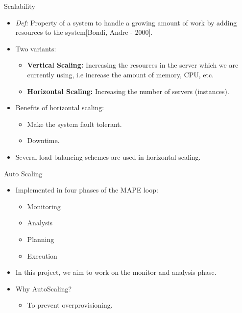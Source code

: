 \documentclass{beamer}
\begin{document}
\begin{frame}{Scalability}
    \begin{itemize}
        
        \pause\item \textit{Def:} Property of a system to handle a growing amount of work by adding resources
            to the system[Bondi, Andre - 2000].
        
        \pause\item Two variants:
            \begin{itemize}
                
                \pause\item \textbf{Vertical Scaling:} Increasing the resources in the
                        server which we are currently using, i.e increase the amount of memory, CPU, etc.
                
                \pause\item \textbf{Horizontal Scaling:} Increasing the number of servers (instances).
            \end{itemize}
        
        \pause\item Benefits of horizontal scaling:
            \begin{itemize}
                
                \pause\item Make the system fault tolerant.
                
                \pause\item Downtime.
            \end{itemize}
        
        \pause\item Several load balancing schemes are used in horizontal scaling.
    \end{itemize}
\end{frame}


\begin{frame}{Auto Scaling}
\begin{itemize}
    
    \pause\item Implemented in four phases of the MAPE loop:
        \begin{itemize}
            
            \pause\item Monitoring
            \pause\item Analysis
            \pause\item Planning
            \pause\item Execution
        \end{itemize}
    \pause\item In this project, we aim to work on the monitor and analysis phase.
    \pause\item Why AutoScaling?
        \begin{itemize}
            \pause\item To prevent overprovisioning.
        \end{itemize}
\end{itemize}
\end{frame}
\end{document}
